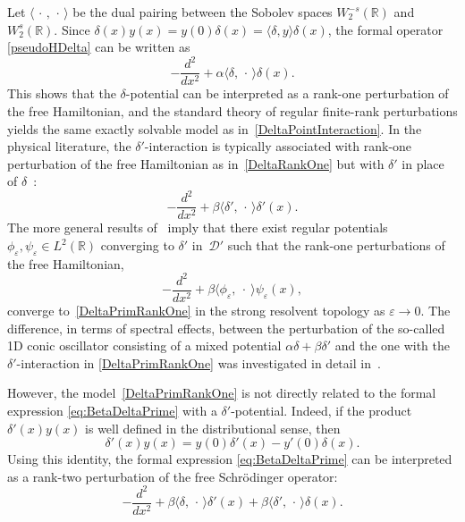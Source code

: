 \documentclass[reqno]{amsart}
\theoremstyle{definition}
\theoremstyle{remark}
\numberwithin{equation}{section}
\newcommand{\Real}{\mathbb R}
\newcommand{\eps}{\varepsilon}
\newcommand{\cD}{\mathcal{D}}
\newcommand{\ra}{\rangle}
\newcommand{\la}{\langle}
\begin{document}
Let $\la\,\cdot\,,\, \cdot\,\ra$ be the dual pairing between the Sobolev spaces $W_2^{-s}(\Real)$ and $W_2^{s}(\Real)$. Since $\delta(x)y(x)=y(0)\delta(x)=\la\delta, y\ra \delta(x)$,  the formal operator \eqref{pseudoHDelta} can be written as
\begin{equation}\label{DeltaRankOne}
  -\frac{d^2}{dx^2}+\alpha \la\delta,\, \cdot\,\ra \delta(x).
\end{equation}
This shows that the $\delta$-potential can be interpreted as a rank-one perturbation of the free Hamiltonian, and the standard theory of regular finite-rank perturbations yields the same exactly solvable model as in~\eqref{DeltaPointInteraction}. In the physical literature, the $\delta'$-interaction is typically associated with rank-one perturbation of the free Hamiltonian as in~\eqref{DeltaRankOne} but with $\delta'$ in place of $\delta$~\cite[Ch.~1.4]{Albeverio2edition}:
\begin{equation}\label{DeltaPrimRankOne}
  -\frac{d^2}{dx^2}+\beta \la\delta',\, \cdot\,\ra \delta'(x).
\end{equation}
The more general results of~\cite{AlbNizh2000, AlbeverioKoshmanenkoKurasovNizhnik2002} imply that there exist regular potentials $\phi_\eps, \psi_\eps \in L^2(\Real)$ converging to $\delta'$ in~$\cD'$ such that the rank-one perturbations of the free Hamiltonian,
\begin{equation*}
    -\frac{d^2}{dx^2}+ \beta  \la \phi_\eps,\ \cdot\ \ra \psi_\eps(x),
\end{equation*}
converge to~\eqref{DeltaPrimRankOne} in the strong resolvent topology as $\eps\to0$. The difference, in terms of spectral effects, between the perturbation of the so-called 1D conic oscillator consisting of a mixed potential $\alpha\delta + \beta\delta'$ and the one with the $\delta'$-interaction in \eqref{DeltaPrimRankOne} was investigated in detail in~\cite{Fassari2018}.

However, the model~\eqref{DeltaPrimRankOne} is not directly related to the formal expression \eqref{eq:BetaDeltaPrime} with a $\delta'$-potential. Indeed, if the product $\delta'(x)y(x)$ is well defined in the distributional sense, then
\[
    \delta'(x)y(x)=y(0)\delta'(x)-y'(0)\delta(x).
\]
Using this identity, the formal expression \eqref{eq:BetaDeltaPrime} can be interpreted as a rank-two perturbation of the free Schrödinger operator:
\begin{equation*}
  -\frac{d^2}{dx^2}+\beta \la\delta,\, \cdot\,\ra \delta'(x)+\beta \la\delta',\, \cdot\,\ra \delta(x).
\end{equation*}
\end{document}
